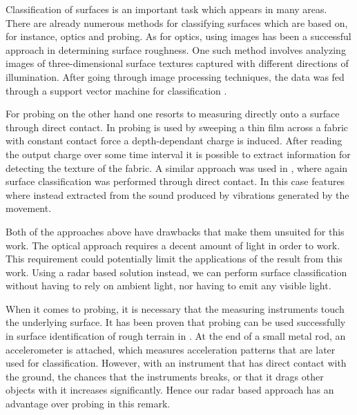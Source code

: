 Classification of surfaces is an important task which appears in many areas. There are already numerous methods for classifying surfaces which are based on, for instance, optics and probing. As for optics, using images has been a successful approach in determining surface roughness. One such method involves analyzing images of three-dimensional surface textures captured with different directions of illumination. After going through image processing techniques, the data was fed through a support vector machine for classification \citep{dong_duan_yang_2008}. 

For probing on the other hand one resorts to measuring directly onto a surface through direct contact. In \citep{song_han_hu_li_2014} probing is used by sweeping a thin film across a fabric with constant contact force a depth-dependant charge is induced. After reading the output charge over some time interval it is possible to extract information for detecting the texture of the fabric. A similar approach was used in \citep{strese_schuwerk_iepure_steinbach_2017}, where again surface classification was performed through direct contact. In this case features where instead extracted from the sound produced by vibrations generated by the movement. 

Both of the approaches above have drawbacks that make them unsuited for this work. The optical approach requires a decent amount of light in order to work. This requirement could potentially limit the applications of the result from this work. Using a radar based solution instead, we can perform surface classification without having to rely on ambient light, nor having to emit any visible light.

When it comes to probing, it is necessary that the measuring instruments touch the underlying surface. It has been proven that probing can be used successfully in surface identification of rough terrain in \citep{giguere_dudek_2011}. At the end of a small metal rod, an accelerometer is attached, which measures acceleration patterns that are later used for classification. However, with an instrument that has direct contact with the ground, the chances that the instruments breaks, or that it drags other objects with it increases significantly. Hence our radar based approach has an advantage over probing in this remark.

